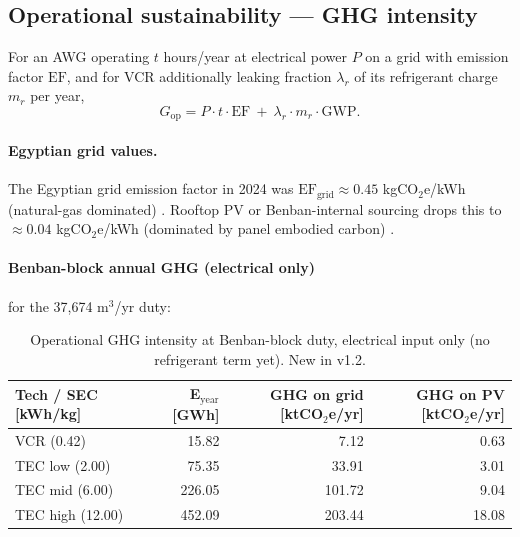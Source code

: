 \documentclass[11pt,a4paper]{article}
\begin{document}
\subsection{Operational sustainability --- GHG intensity}
For an AWG operating $t$ hours/year at electrical power $P$ on a grid with emission factor $\mathrm{EF}$, and for VCR additionally leaking fraction $\lambda_r$ of its refrigerant charge $m_r$ per year,
\begin{equation}
G_{\mathrm{op}} = P\cdot t\cdot \mathrm{EF}\ +\ \lambda_r\cdot m_r\cdot \mathrm{GWP}.
\label{eq:ghg_op}
\end{equation}

\paragraph{Egyptian grid values.} The Egyptian grid emission factor in 2024 was $\mathrm{EF}_{\mathrm{grid}}\approx 0.45$ kgCO$_2$e/kWh (natural-gas dominated) \citep{iea_egypt_2024}. Rooftop PV or Benban-internal sourcing drops this to $\approx 0.04$ kgCO$_2$e/kWh (dominated by panel embodied carbon) \citep{ipcc_ar6_wg3}.

\paragraph{Benban-block annual GHG (electrical only)} for the 37,674 m$^3$/yr duty:
\begin{table}[h]
\centering\small
\caption{Operational GHG intensity at Benban-block duty, electrical input only (no refrigerant term yet). New in v1.2.}
\label{tab:ghg_elec}
\begin{tabular}{@{}lrrr@{}}
\toprule
\textbf{Tech / SEC [kWh/kg]} & \textbf{E$_{\mathrm{year}}$ [GWh]} & \textbf{GHG on grid [ktCO$_2$e/yr]} & \textbf{GHG on PV [ktCO$_2$e/yr]}\\
\midrule
VCR (0.42)   & 15.82  & 7.12   & 0.63 \\
TEC low (2.00)& 75.35 & 33.91  & 3.01 \\
TEC mid (6.00)& 226.05& 101.72 & 9.04 \\
TEC high (12.00)& 452.09& 203.44& 18.08 \\
\bottomrule
\end{tabular}
\end{table}
\end{document}
